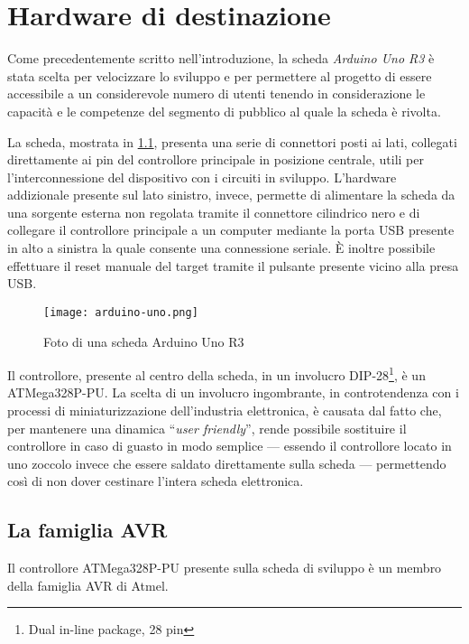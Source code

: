 \chapter{Hardware di destinazione}
    
Come precedentemente scritto nell'introduzione, la scheda \textit{Arduino Uno R3} è stata scelta per velocizzare lo sviluppo e per permettere al progetto di essere accessibile a un considerevole numero di utenti tenendo in considerazione le capacità e le competenze del segmento di pubblico al quale la scheda è rivolta.

La scheda, mostrata in \cref{fig:arduino-uno-r3}, presenta una serie di connettori posti ai lati, collegati direttamente ai pin del controllore principale in posizione centrale, utili per l'interconnessione del dispositivo con i circuiti in sviluppo.
L'hardware addizionale presente sul lato sinistro, invece, permette di alimentare la scheda da una sorgente esterna non regolata tramite il connettore cilindrico nero e di collegare il controllore principale a un computer mediante la porta USB presente in alto a sinistra la quale consente una connessione seriale.
È inoltre possibile effettuare il reset manuale del target tramite il pulsante presente vicino alla presa USB.\@

\begin{figure}[h]
    \centering
    \texttt{[image: arduino-uno.png]}
    \caption[]{Foto di una scheda Arduino Uno R3\cite{img:arduino-uno-r3}}\label{fig:arduino-uno-r3}
\end{figure}

Il controllore, presente al centro della scheda, in un involucro DIP-28\footnote{Dual in-line package, 28 pin}, è un ATMega328P-PU\cite{site:arduino-uno-doc}. La scelta di un involucro ingombrante, in controtendenza con i processi di miniaturizzazione dell'industria elettronica, è causata dal fatto che, per mantenere una dinamica ``\textit{user friendly}'', rende possibile sostituire il controllore in caso di guasto in modo semplice --- essendo il controllore locato in uno zoccolo invece che essere saldato direttamente sulla scheda --- permettendo così di non dover cestinare l'intera scheda elettronica.\cite{site:arduino-uno-doc}

\section{La famiglia AVR}

Il controllore ATMega328P-PU presente sulla scheda di sviluppo è un membro della famiglia AVR di Atmel\cite[1]{avr:m328p}.

